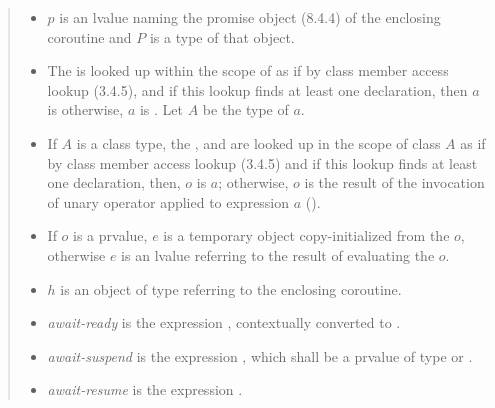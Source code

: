 \begin{quote}
\begin{itemize}
  \item $p$ is an lvalue naming the promise object (8.4.4) of the enclosing coroutine and $P$ is a type of that object.
  \item The   is looked up within the scope of  as if by class member access lookup (3.4.5), and if this lookup finds at least one declaration, then $a$ is  otherwise, $a$ is . Let $A$ be the type of $a$. 
  \item If $A$ is a class type, the 
  ,  and  are looked up in the scope of class $A$ as if by class member access lookup (3.4.5) and if this lookup finds at least one declaration, then, $o$ is $a$; otherwise, $o$ is
  the result of the invocation of unary  operator applied to expression $a$ ().
  \item If $o$ is a prvalue, $e$ is a temporary object copy-initialized from the $o$, otherwise $e$ is an lvalue referring to the result of evaluating the $o$.
  
  \item $h$ is an object of type  referring to the enclosing coroutine.
  \item \textit{await-ready} is the expression , contextually converted to .
  \item \textit{await-suspend} is the expression , which shall be a prvalue of type  or .
  \item \textit{await-resume} is the expression .
\end{itemize}


\end{quote}
